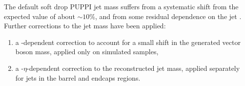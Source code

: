 \vspace*{1\baselineskip}

\noindent The default soft drop PUPPI jet mass suffers from a systematic shift from the expected value of about $\sim 10\%$, and from some residual dependence on the jet \pt. Further corrections to the jet mass have been applied:

\begin{enumerate}
  \item a \pt-dependent correction to account for a small shift in the generated vector boson mass, applied only on simulated samples,
  \item a \pt-$\eta$-dependent correction to the reconstructed jet mass, applied separately for jets in the barrel and endcaps regions.
\end{enumerate}




